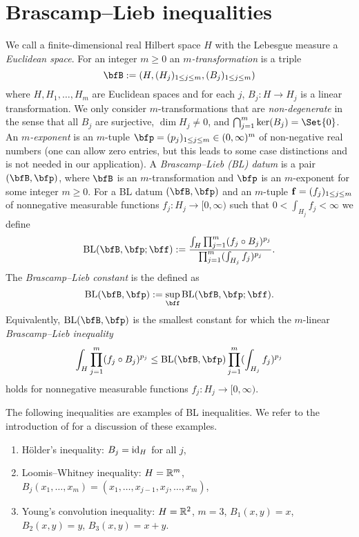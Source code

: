 \section{Brascamp--Lieb inequalities}
We call a finite-dimensional real Hilbert space $H$ with the Lebesgue measure a \emph{Euclidean space}.
For an integer $m \geq 0$ an \emph{$m$-transformation} is a triple
\[
\bfB := (H, (H_j)_{1 \leq j \leq m}, (B_j)_{1 \leq j \leq m})
\]
where $H, H_1,\dotsc,H_m$ are Euclidean spaces and for each $j$, $B_j: H \to H_j$ is a linear transformation.
We only consider $m$-transformations that are \emph{non-degenerate} in the sense that all $B_j$ are surjective, $\dim H_{j} \neq 0$, and $\bigcap_{j=1}^m \ker(B_j) = \Set{0}$.
An \emph{$m$-exponent} is an $m$-tuple $\p = (p_j)_{1 \leq j \leq m} \in (0,\infty)^m$ of non-negative real numbers (one can allow zero entries, but this leads to some case distinctions and is not needed in our application).
A \emph{Brascamp--Lieb (BL) datum} is a pair $(\bfB,\p)$, where $\bfB$ is an
$m$-transformation and $\p$ is an $m$-exponent for some integer $m \geq 0$.
For a BL datum $(\bfB,\p)$ and an $m$-tuple ${\bf{f}} = (f_j)_{1 \leq j \leq m}$ of nonnegative measurable functions $f_j: H_j \to [0,\infty)$ such that $0 < \int_{H_j} f_j < \infty$ we define
\[
\BL(\bfB,\p; \f) :=
\frac{\int_H \prod_{j=1}^m (f_j \circ B_j)^{p_j}}{\prod_{j=1}^m (\int_{H_j} f_j)^{p_j}}.
\]
The \emph{Brascamp--Lieb constant} is the defined as
\[
\BL( \bfB, \p ) :=
\sup_{\f} \BL(\bfB,\p;\f).
\]
Equivalently, $\BL(\bfB,\p)$ is the smallest constant for which the $m$-linear \emph{Brascamp--Lieb inequality}
\begin{equation}\label{BL}
\int_{H} \prod_{j=1}^m (f_j \circ B_j)^{p_j}
\leq \BL( \bfB, \p ) \prod_{j=1}^m (\int_{H_j} f_j)^{p_j}
\end{equation}
holds for nonnegative measurable functions $f_j: H_j \to [0,\infty)$.

\begin{example}
The following inequalities are examples of BL inequalities.
We refer to the introduction of \cite{MR2377493} for a discussion of these examples.
\begin{enumerate}
\item H\"older's inequality: $B_{j}=\mathrm{id}_{H}$ for all $j$,
\item Loomis--Whitney inequality: $H=\mathbb{R}^{m}$, $B_{j}(x_{1},\dotsc,x_{m})=(x_{1},\dotsc,x_{j-1},x_{j},\dotsc,x_{m})$,
\item Young's convolution inequality: $H=\mathbb{R}^{2}$, $m=3$, $B_{1}(x,y)=x$, $B_{2}(x,y)=y$, $B_{3}(x,y)=x+y$.
\end{enumerate}
\end{example}

